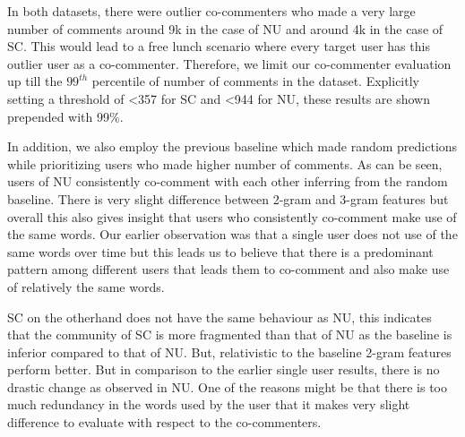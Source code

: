 In both datasets, there were outlier co-commenters who made a very large number of comments  around 9k in the case of NU and  around 4k in the case of SC. This would lead to a free lunch scenario where every target user has this outlier user as a co-commenter. Therefore, we limit our co-commenter evaluation up till the $99^{th}$ percentile of number of comments in the dataset. Explicitly setting a threshold of <357 for SC and <944 for NU, these results are shown prepended with 99\%.

In addition, we also employ the previous baseline which made random predictions while prioritizing users who made higher number of comments. As can be seen, users of NU consistently co-comment with each other inferring from the random baseline. There is very slight difference between 2-gram and 3-gram features but overall this also gives insight that users who consistently co-comment make use of the same words. Our earlier observation was that a single user does not use of the same words over time but this leads us to believe that there is a predominant pattern among different users that leads them to co-comment and also make use of relatively the same words.

SC on the otherhand does not have the same behaviour as NU, this indicates that the community of SC is more fragmented than that of NU as the baseline is inferior compared to that of NU. But, relativistic to the baseline 2-gram features perform better. But in comparison to the earlier single user results, there is no drastic change as observed in NU. One of the reasons might be that there is too much redundancy in the words used by the user that it makes very slight difference to evaluate with respect to the co-commenters.